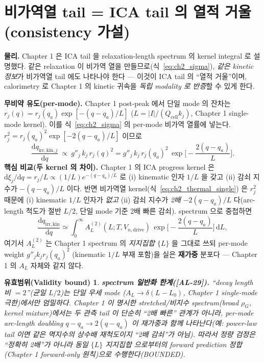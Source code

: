 \documentclass[11pt,a4paper]{article}
\newtheorem*{boundbox}{유효범위(Validity bound)}
\newcommand{\dd}{\mathrm{d}}
\newcommand{\drive}{\mathrm{drive}}
\newcommand{\cell}{\mathrm{cell}}
\newcommand{\irr}{\mathrm{irr}}
\newcommand{\kin}{\mathrm{kin}}
\newcommand{\AL}[1]{\textsf{[AL-#1]}}
\begin{document}
\section{비가역열 tail = ICA tail 의 열적 거울 (consistency 가설)}\label{sec:ch2_thermal_tail}
\textbf{물리.} Chapter 1 은 ICA tail 을 relaxation-length spectrum 의 kernel integral 로 설명했다. 같은
relaxation 이 비가역 열을 만들므로(식~\eqref{eq:ch2_sigma}), \emph{같은 kinetic 정보}가 비가역열 tail 에도
나타나야 한다 — 이것이 ICA tail 의 ``열적 거울''이며, calorimetry 로 Chapter 1 의 kinetic 귀속을 \emph{독립
modality 로 반증}할 수 있게 한다.

\textbf{무비약 유도(per-mode).} Chapter 1 post-peak 에서 단일 mode 의 잔차는 $r_j(q)=r_j(q_a)\exp[-(q-q_a)/L]$
($L=|I|/(Q_\cell k_j)$, Chapter 1 single-mode kernel). 이를 식~\eqref{eq:ch2_sigma} 의 per-mode 비가역
열률에 넣는다. $r_j^2=r_j(q_a)^2\exp[-2(q-q_a)/L]$ 이므로
\begin{equation}
\frac{\dd q_{\irr,\kin,j}}{\dd q}\ \propto\ g''_j\,k_j\,r_j(q)^2
= g''_j\,k_j\,r_j(q_a)^2\,\exp\!\Big[-\frac{2(q-q_a)}{L}\Big].
\label{eq:ch2_thermal_single}
\end{equation}
\textbf{핵심 비교(두 kernel 의 차이).} Chapter 1 의 ICA progress kernel 은 $\dd\xi_j/\dd q=r_j/L\propto(1/L)e^{-(q-q_a)/L}$
로 (i) kinematic 인자 $1/L$ 을 갖고 (ii) 감쇠 지수가 $-(q-q_a)/L$ 이다. 반면 비가역열 kernel(식~\eqref{eq:ch2_thermal_single})
은 $r_j^2$ 때문에 (i) kinematic $1/L$ 인자가 \emph{없고} (ii) 감쇠 지수가 \emph{2배} $-2(q-q_a)/L$ 다(arc-length
척도가 절반 $L/2$, 단일 mode 기준 2배 빠른 감쇠). spectrum 으로 중첩하면
\begin{equation}
\boxed{\;\frac{\dd q_{\irr,\kin}}{\dd q}\simeq\int_0^\infty A_L^{(2)}(L;T,V_{n,\drive})\,
\exp\!\Big[-\frac{2(q-q_a)}{L}\Big]\,\dd L,\;}
\label{eq:ch2_thermal_kernel}
\end{equation}
여기서 $A_L^{(2)}$ 는 Chapter 1 spectrum 의 \emph{지지집합} $\{L\}$ 을 그대로 쓰되 per-mode weight $g''_j k_j r_j(q_a)^2$
(kinematic $1/L$ 부재 포함)을 실은 \textbf{재가중} 분포다 — Chapter 1 의 $A_L$ 자체와 같지 않다.
\begin{boundbox}
\textbf{spectrum 일반화 한계(\AL{29}).} ``decay length 비 $=2$''(균일 $L/2$)는 \emph{단일 우세 mode}
($A_L\to\delta(L-L_0)$, Chapter 1 single-mode 극한)에서만 엄밀하다. Chapter 1 이 명시한 stretched/비지수
spectrum(broad $\rho_G$, kernel mixture)에서는 두 관측 tail 이 단순히 ``2배 빠른'' 관계가 아니라, per-mode
arc-length doubling $q-q_a\to2(q-q_a)$ 이 \emph{재가중}과 함께 나타난다(예: power-law tail 이면 같은 멱지수의
상수배 재척도이지 ``2배 감쇠''가 아님). 따라서 정량 검정은 ``정확히 2배''가 아니라 \emph{동일 $\{L\}$ 지지집합
으로부터의 forward prediction 정합}(Chapter 1 forward-only 원칙)으로 수행한다(BOUNDED).
\end{boundbox}
\end{document}
